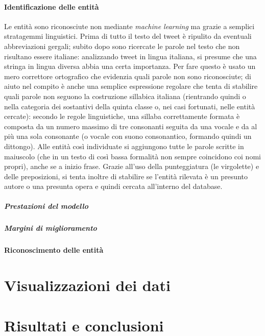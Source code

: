 \documentclass[12pt, a4paper, twocolumn]{article} %
\begin{document}
\subsection{Identificazione delle entità}
Le entità sono riconosciute non mediante \textit{machine learning} ma grazie a semplici stratagemmi linguistici.
Prima di tutto il testo del tweet è ripulito da eventuali abbreviazioni gergali; subito dopo sono ricercate le parole nel testo che non risultano essere italiane: analizzando tweet in lingua italiana, si presume che una stringa in lingua diversa abbia una certa importanza.
Per fare questo è usato un mero correttore ortografico che evidenzia quali parole non sono riconosciute; di aiuto nel compito è anche una semplice espressione regolare che tenta di stabilire quali parole non seguono la costruzione sillabica italiana (rientrando quindi o nella categoria dei sostantivi della quinta classe o, nei casi fortunati, nelle entità cercate): secondo le regole linguistiche, una sillaba correttamente formata è composta da un numero massimo di tre consonanti seguita da una vocale e da al più una sola consonante (o vocale con suono consonantico, formando quindi un dittongo).
Alle entità così individuate si aggiungono tutte le parole scritte in maiuscolo (che in un testo di così bassa formalità non sempre coincidono coi nomi propri), anche se a inizio frase.
Grazie all'uso della punteggiatura (le virgolette) e delle preposizioni, si tenta inoltre di stabilire se l'entità rilevata è un presunto autore o una presunta opera e quindi cercata all'interno del database.

\subsubsection{Prestazioni del modello}

\subsubsection{Margini di miglioramento}

\subsection{Riconoscimento delle entità}

\hfill
\newpage
\part{Visualizzazioni dei dati}

\hfill
\newpage
\part{Risultati e conclusioni}




\hfill
\newpage
\printbibliography[title={Bibliografia}]

\end{document}
